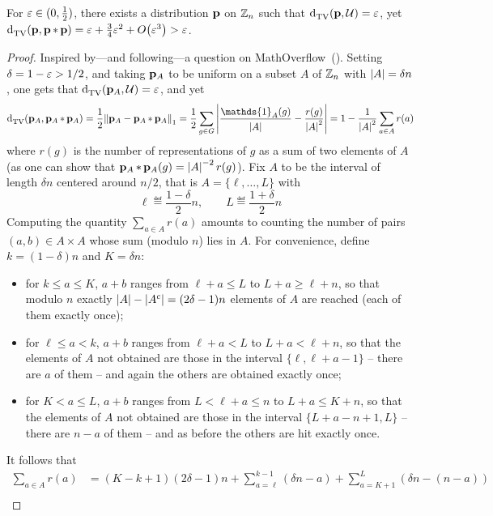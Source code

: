 \begin{claim}\label{claim:counterexample:convolution}
For $\varepsilon\in(0,\frac12)$, there exists a distribution $\mathbf{p}$ on $\mathbb{Z}_n$ such that ${\operatorname{d}_{\textrm{TV}}^{}\!\left({ \mathbf{p} ,  \mathcal{U} }\right)} = \varepsilon$, yet $\totalvardist{ \D }{ \D\convolution \D } = \eps + \frac{3}{4}\eps^2 + \bigO{\eps^3} > \eps$.
\end{claim}
\begin{proof}
Inspired by---and following---a question on MathOverflow~(\cite{MathOverflow:13:counterexample}). Setting $\delta = 1-\varepsilon > 1/2$, and taking $\mathbf{p}_A$ to be uniform on a subset $A$ of $\mathbb{Z}_n$ with $\left\lvert A \right\rvert=\delta n$, one gets that ${\operatorname{d}_{\textrm{TV}}^{}\!\left({\mathbf{p}_A, \mathcal{U}}\right)}=\varepsilon$, and yet
  \[
    \totalvardist{ \D_A }{ \D_A\convolution \D_A } = \frac{1}{2}\normone{ \D_A - \D_A\convolution \D_A } = \frac{1}{2} \sum_{g\in G} \abs{ \frac{\mathds{1}_A(g)}{\abs{A}^{\vphantom{2}}}-\frac{r(g)}{\abs{A}^2} } = 1-\frac{1}{\abs{A}^2}\sum_{a\in A}r(a)
  \]
  where $r(g)$ is the number of representations of $g$ as a sum of two elements of $A$ (as one can show that $\mathbf{p}_A\operatorname{\ast} \mathbf{p}_A(g)=\left\lvert A \right\rvert^{-2}r(g)$). Fix $A$ to be the interval of length $\delta n$ centered around $n/2$, that is $A=\{\ell,\dots,L\}$ with 
  \[
      \ell \eqdef \frac{1-\delta}{2}n, \qquad L \eqdef \frac{1+\delta}{2}n
  \]
  Computing the quantity $\sum_{a\in A}r(a)$ amounts to counting the number of pairs $(a,b)\in A\times A$ whose sum (modulo $n$) lies in $A$. For convenience, define $k = (1-\delta)n$ and $K=\delta n$:
  \begin{itemize}
    \item for $k \leq a \leq K$, $a+b$ ranges from $\ell+a \leq L$ to $L+a \geq \ell + n$, so that modulo $n$ exactly $\left\lvert A \right\rvert - \left\lvert A^c \right\rvert =  (2\delta-1)n$ elements of $A$ are reached (each of them exactly once);
    \item for $\ell \leq a < k$, $a+b$ ranges from $\ell+a < L$ to $L+a < \ell + n$, so that the elements of $A$ not obtained are those in the interval $\{\ell, \ell+a-1\}$ -- there are $a$ of them -- and again the others are obtained exactly once;
    \item for $K < a \leq L$, $a+b$ ranges from $L < \ell+a \leq n$ to $L+a \leq K + n$, so that the elements of $A$ not obtained are those in the interval $\{L+a-n+1, L\}$ -- there are $n-a$ of them -- and as before the others are hit exactly once.
  \end{itemize}
  It follows that
  \begin{align*}
    \sum_{a\in A}r(a) &= (K-k+1)(2\delta-1)n + \sum_{a=\ell}^{k-1} (\delta n-a) + \sum_{a=K+1}^{L} (\delta n - (n-a)) \\

\end{align*}
\end{proof}
